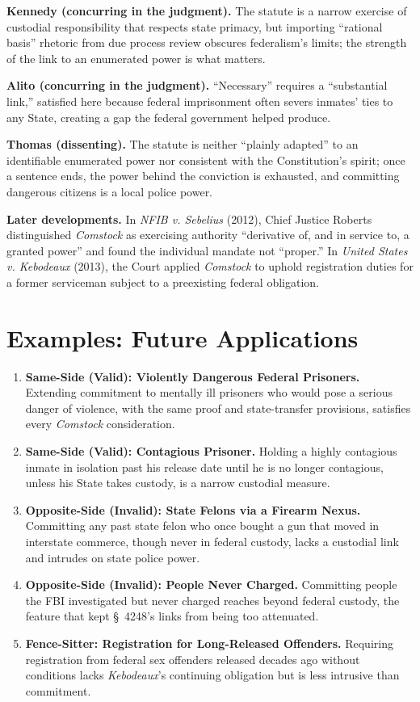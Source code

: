 \documentclass[12pt]{article}
\begin{document}
\textbf{Kennedy (concurring in the judgment).} The statute is a narrow exercise of custodial responsibility that respects state primacy, but importing ``rational basis'' rhetoric from due process review obscures federalism's limits; the strength of the link to an enumerated power is what matters.

\textbf{Alito (concurring in the judgment).} ``Necessary'' requires a ``substantial link,'' satisfied here because federal imprisonment often severs inmates' ties to any State, creating a gap the federal government helped produce.

\textbf{Thomas (dissenting).} The statute is neither ``plainly adapted'' to an identifiable enumerated power nor consistent with the Constitution's spirit; once a sentence ends, the power behind the conviction is exhausted, and committing dangerous citizens is a local police power.

\textbf{Later developments.} In \textit{NFIB v. Sebelius} (2012), Chief Justice Roberts distinguished \textit{Comstock} as exercising authority ``derivative of, and in service to, a granted power'' and found the individual mandate not ``proper.'' In \textit{United States v. Kebodeaux} (2013), the Court applied \textit{Comstock} to uphold registration duties for a former serviceman subject to a preexisting federal obligation.

\section{Examples: Future Applications}

\begin{enumerate}
\item \textbf{Same-Side (Valid): Violently Dangerous Federal Prisoners.} Extending commitment to mentally ill prisoners who would pose a serious danger of violence, with the same proof and state-transfer provisions, satisfies every \textit{Comstock} consideration.
\item \textbf{Same-Side (Valid): Contagious Prisoner.} Holding a highly contagious inmate in isolation past his release date until he is no longer contagious, unless his State takes custody, is a narrow custodial measure.
\item \textbf{Opposite-Side (Invalid): State Felons via a Firearm Nexus.} Committing any past state felon who once bought a gun that moved in interstate commerce, though never in federal custody, lacks a custodial link and intrudes on state police power.
\item \textbf{Opposite-Side (Invalid): People Never Charged.} Committing people the FBI investigated but never charged reaches beyond federal custody, the feature that kept \S~4248's links from being too attenuated.
\item \textbf{Fence-Sitter: Registration for Long-Released Offenders.} Requiring registration from federal sex offenders released decades ago without conditions lacks \textit{Kebodeaux}'s continuing obligation but is less intrusive than commitment.
\end{enumerate}
\end{document}
